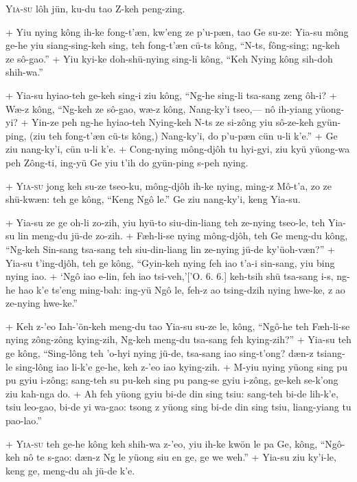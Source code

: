 \header
\lettrine{Y}{ia-su} lôh jün, ku-du tao Z-keh peng-zing.
\par
\hspace{1ex}
+	Yiu nying kông ih-ke fong-t'æn, kw'eng ze p'u-pæn, tao Ge su-ze: Yia-su mông ge-he yiu siang-sing-keh sing, teh fong-t'æn cü-ts kông, ``N-ts, fông-sing; ng-keh ze sô-gao.''
+	Yiu kyi-ke doh-shü-nying sing-li kông, ``Keh Nying kông sih-doh shih-wa.''
\par
+	Yia-su hyiao-teh ge-keh sing-i ziu kông, ``Ng-he sing-li tsa-sang zeng ôh-i?
+	Wæ-z kông, ``Ng-keh ze sô-gao, wæ-z kông, Nang-ky'i tseo,--- nô ih-yiang yüong-yi?
+	Yin-ze peh ng-he hyiao-teh Nying-keh N-ts ze si-zông yiu sô-ze-keh gyün-ping, (ziu teh fong-t'æn cü-ts kông,) Nang-ky'i, do p'u-pæn cün u-li k'e.''
+	Ge ziu nang-ky'i, cün u-li k'e.
+	Cong-nying mông-djôh tu hyi-gyi, ziu kyü yüong-wa peh Zông-ti, ing-yü Ge yiu t'ih do gyün-ping s-peh nying.
\par
+	\textsc{Yia-su} jong keh su-ze tseo-ku, mông-djôh ih-ke nying, ming-z Mô-t'a, zo ze shü-kwæn: teh ge kông, ``Keng Ngô le.'' Ge ziu nang-ky'i, keng Yia-su.
\par
+	Yia-su ze ge oh-li zo-zih, yiu hyü-to siu-din-liang teh ze-nying tseo-le, teh Yia-su lin meng-du jü-de zo-zih.
+	Fæh-li-se nying mông-djôh, teh Ge meng-du kông, ``Ng-keh Sin-sang tsa-sang teh siu-din-liang lin ze-nying jü-de ky'üoh-væn?''
+	Yia-su t'ing-djôh, teh ge kông, ``Gyin-keh nying feh iao t'a-i sin-sang, yiu bing nying iao.
+	`Ngô iao e-lin, feh iao tsi-veh,'['O. 6. 6.] keh-tsih shü tsa-sang i-s, ng-he hao k'e ts'eng ming-bah: ing-yü Ngô le, feh-z ao tsing-dzih nying hwe-ke, z ao ze-nying hwe-ke.''
\par
+	Keh z-'eo Iah-'ön-keh meng-du tao Yia-su su-ze le, kông, ``Ngô-he teh Fæh-li-se nying zông-zông kying-zih, Ng-keh meng-du tsa-sang feh kying-zih?''
+	Yia-su teh ge kông, ``Sing-lông teh 'o-hyi nying jü-de, tsa-sang iao sing-t'ong? dæn-z tsiang-le sing-lông iao li-k'e ge-he, keh z-'eo iao kying-zih.
+	M-yiu nying yüong sing pu pu gyiu i-zông; sang-teh su pu-keh sing pu pang-se gyiu i-zông, ge-keh se-k'ong ziu kah-nga do.
+	Ah feh yüong gyiu bi-de din sing tsiu: sang-teh bi-de lih-k'e, tsiu leo-gao, bi-de yi wa-gao: tsong z yüong sing bi-de din sing tsiu, liang-yiang tu pao-lao.''
\par
+	\textsc{Yia-su} teh ge-he kông keh shih-wa z-'eo, yiu ih-ke kwön le pa Ge, kông, ``Ngô-keh nô te s-gao: dæn-z Ng le yüong siu en ge, ge we weh.''
+	Yia-su ziu ky'i-le, keng ge, meng-du ah jü-de k'e.
\par

